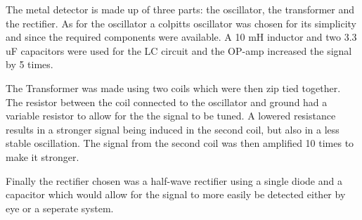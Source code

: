 % 
The metal detector is made up of three parts: the oscillator, the transformer and the rectifier.
As for the oscillator a colpitts oscillator was chosen for its simplicity and since the required components were available. 
A 10 mH inductor and two 3.3 uF capacitors were used for the LC circuit and the OP-amp increased the signal by 5 times.

The Transformer was made using two coils which were then zip tied together. The resistor between the coil connected to the oscillator 
and ground had a variable resistor to allow for the the signal to be tuned. A lowered resistance results in a stronger signal
 being induced in the second coil, but also in a less stable oscillation. The signal from the second coil was then amplified 10 times to make
 it stronger.

Finally the rectifier chosen was a  half-wave rectifier using a single diode and a capacitor which would allow for the signal to more 
easily be detected either by eye or a seperate system.